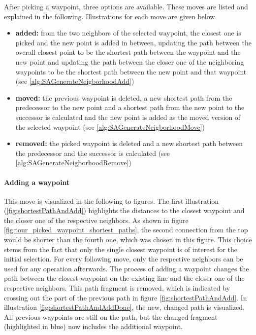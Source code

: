 After picking a waypoint, three options are available.
These moves are listed and explained in the following.
Illustrations for each move are given below.


\begin{itemize}
	\item \textbf{added:} from the two neighbors of the selected waypoint, the closest one is picked and the new point is added in between, updating the path between the overall closest point to be the shortest path between the waypoint and the new point and updating the path between the closer one of the neighboring waypoints to be the shortest path between the new point and that waypoint (see \ref{alg:SAGenerateNeigborhoodAdd})
	\item \textbf{moved:} the previous waypoint is deleted, a new shortest path from the predecessor to the new point and a shortest path from the new point to the successor is calculated and the new point is added as the moved version of the selected waypoint (see \ref{alg:SAGenerateNeigborhoodMove})
	\item \textbf{removed:} the picked waypoint is deleted and a new shortest path between the predecessor and the successor is calculated (see \ref{alg:SAGenerateNeigborhoodRemove})
\end{itemize}


\paragraph{Adding a waypoint}
This move is visualized in the following to figures.
The first illustration (\ref{fig:shortestPathAndAdd}) highlights the distances to the closest waypoint and the closer one of the respective neighbors.
As shown in figure \ref{fig:tour_picked_waypoint_shortest_paths}, the second connection from the top would be shorter than the fourth one, which was chosen in this figure.
This choice stems from the fact that only the single closest waypoint is of interest for the initial selection. 
For every following move, only the respective neighbors can be used for any operation afterwards.
The process of adding a waypoint changes the path between the closest waypoint on the existing line and the closer one of the respective neighbors. 
This path fragment is removed, which is indicated by crossing out the part of the previous path in figure \ref{fig:shortestPathAndAdd}.
In illustration \ref{fig:shortestPathAndAddDone}, the new, changed path is visualized.
All previous waypoints are still on the path, but the changed fragment (highlighted in blue) now includes the additional waypoint.

